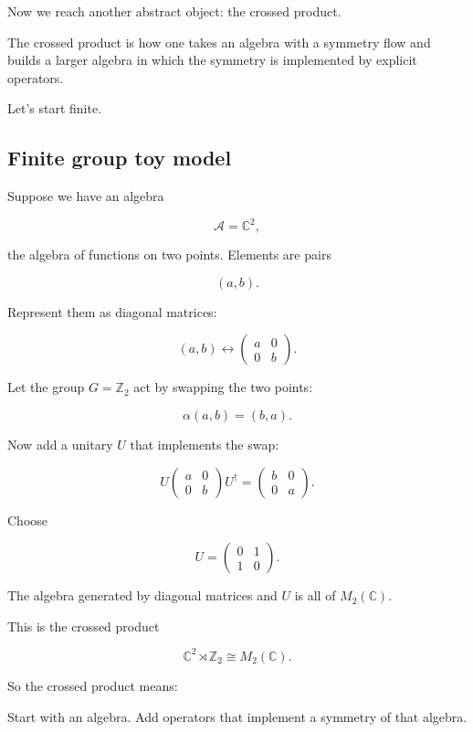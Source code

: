 \documentclass[11pt,a4paper]{article}
\newenvironment{qiqtquote}{\begin{mdframed}[style=quotestyle]}{\end{mdframed}}
\begin{document}
Now we reach another abstract object: the crossed product.

The crossed product is how one takes an algebra with a symmetry flow and builds a larger algebra in which the symmetry is implemented by explicit operators.

Let’s start finite.

\subsection{Finite group toy model}

Suppose we have an algebra

\[
\mathcal{A}=\mathbb{C}^2,
\]

the algebra of functions on two points. Elements are pairs

\[
(a,b).
\]

Represent them as diagonal matrices:

\[
(a,b)\leftrightarrow
\begin{pmatrix}
a&0\\
0&b
\end{pmatrix}.
\]

Let the group $G=\mathbb{Z}_2$ act by swapping the two points:

\[
\alpha(a,b)=(b,a).
\]

Now add a unitary $U$ that implements the swap:

\[
U
\begin{pmatrix}
a&0\\
0&b
\end{pmatrix}
U^\dagger
=
\begin{pmatrix}
b&0\\
0&a
\end{pmatrix}.
\]

Choose

\[
U=
\begin{pmatrix}
0&1\\
1&0
\end{pmatrix}.
\]

The algebra generated by diagonal matrices and $U$ is all of $M_2(\mathbb{C})$.

This is the crossed product

\[
\mathbb{C}^2\rtimes \mathbb{Z}_2
\cong
M_2(\mathbb{C}).
\]

So the crossed product means:

\begin{qiqtquote}
Start with an algebra. Add operators that implement a symmetry of that algebra.
\end{qiqtquote}
\end{document}
